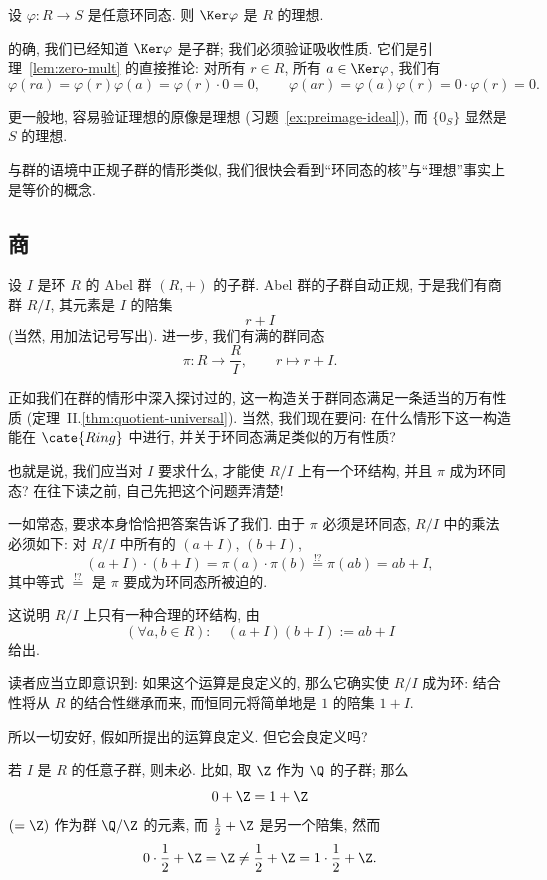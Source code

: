 \begin{example}
\label{ex:kernel-ideal}
设 $\varphi : R \to S$ 是任意环同态. 则 $\Ker \varphi$ 是 $R$ 的理想.

的确, 我们已经知道 $\Ker \varphi$ 是子群; 我们必须验证吸收性质. 它们是引理~\ref{lem:zero-mult} 的直接推论: 对所有 $r \in R$, 所有 $a \in \Ker \varphi$, 我们有
\[
\varphi(ra) = \varphi(r)\varphi(a) = \varphi(r)\cdot 0 = 0, \qquad \varphi(ar) = \varphi(a)\varphi(r) = 0\cdot\varphi(r) = 0.
\]
\end{example}

更一般地, 容易验证理想的原像是理想 (习题~\ref{ex:preimage-ideal}), 而 $\{0_S\}$ 显然是 $S$ 的理想.

与群的语境中正规子群的情形类似, 我们很快会看到``环同态的核''与``理想''事实上是等价的概念.

\subsection{商}
\label{subsec:quotient-rings}

设 $I$ 是环 $R$ 的 Abel 群 $(R, +)$ 的子群. Abel 群的子群自动正规, 于是我们有商群 $R/I$, 其元素是 $I$ 的陪集
\[
r + I
\]
(当然, 用加法记号写出). 进一步, 我们有满的群同态
\[
\pi : R \to \frac{R}{I}, \qquad r \mapsto r + I.
\]

正如我们在群的情形中深入探讨过的, 这一构造关于群同态满足一条适当的万有性质 (定理~II.\ref{thm:quotient-universal}). 当然, 我们现在要问: 在什么情形下这一构造能在 $\cate{Ring}$ 中进行, 并关于环同态满足类似的万有性质?

也就是说, 我们应当对 $I$ 要求什么, 才能使 $R/I$ 上有一个环结构, 并且 $\pi$ 成为环同态? 在往下读之前, 自己先把这个问题弄清楚!

一如常态, 要求本身恰恰把答案告诉了我们. 由于 $\pi$ 必须是环同态, $R/I$ 中的乘法必须如下: 对 $R/I$ 中所有的 $(a + I)$, $(b + I)$,
\[
(a + I) \cdot (b + I) = \pi(a) \cdot \pi(b) \overset{!?}{=} \pi(ab) = ab + I,
\]
其中等式 $\overset{!?}{=}$ 是 $\pi$ 要成为环同态所被迫的.

这说明 $R/I$ 上只有一种合理的环结构, 由
\[
(\forall a, b \in R): \quad (a + I)(b + I) := ab + I
\]
给出.

读者应当立即意识到: 如果这个运算是良定义的, 那么它确实使 $R/I$ 成为环: 结合性将从 $R$ 的结合性继承而来, 而恒同元将简单地是 $1$ 的陪集 $1 + I$.

所以一切安好, 假如所提出的运算良定义. 但它会良定义吗?

\begin{example}
\label{ex:not-welldef}
若 $I$ 是 $R$ 的任意子群, 则未必. 比如, 取 $\Z$ 作为 $\Q$ 的子群; 那么
\[
0 + \Z = 1 + \Z
\]
$(= \Z)$ 作为群 $\Q/\Z$ 的元素, 而 $\frac{1}{2} + \Z$ 是另一个陪集, 然而
\[
0 \cdot \frac{1}{2} + \Z = \Z \neq \frac{1}{2} + \Z = 1 \cdot \frac{1}{2} + \Z.
\]
\end{example}

